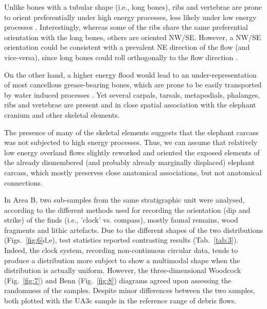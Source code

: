 \documentclass[preprint,authoryear,times]{elsarticle} %
\begin{document}

Unlike bones with a tubular shape (i.e., long bones), ribs and vertebrae are prone to orient preferentially under high energy processes, less likely under low energy processes \citep{Dominguez-Rodrigo2013,Dominguez-Rodrigo2014}. Interestingly, whereas some of the ribs share the same preferential orientation with the long bones, others are oriented NW/SE. However, a NW/SE orientation could be consistent with a prevalent NE direction of the flow (and vice-versa), since long bones could roll orthogonally to the flow direction \citep{Voorhies1966}.

On the other hand, a higher energy flood would lead to an under-representation of most cancellous grease-bearing bones, which are prone to be easily transported by water induced processes \citep{Voorhies1966}. Yet several carpals, tarsals, metapodials, phalanges, ribs and vertebrae are present and in close spatial association with the elephant cranium and other skeletal elements.

The presence of many of the skeletal elements suggests that the elephant carcass was not subjected to high energy processes. Thus, we can assume that relatively low energy overland flows slightly reworked and oriented the exposed elements of the already dismembered (and probably already marginally displaced) elephant carcass, which mostly preserves close anatomical associations, but not anatomical connections.



In Area B, two sub-samples from the same stratigraphic unit were analysed, according to the different methods used for recording the orientation (dip and strike) of the finds (i.e., 'clock' vs. compass), mostly faunal remains, wood fragments and lithic artefacts. Due to the different shapes of the two distributions (Figs.~\ref{fig:6}d,e), test statistics reported contrasting results (Tab.~\ref{tab:3}). Indeed, the clock system, recording non-continuous circular data, tends to produce a distribution more subject to show a multimodal shape when the distribution is actually uniform. However, the three-dimensional Woodcock (Fig.~\ref{fig:7}) and Benn (Fig.~\ref{fig:8}) diagrams agreed upon assessing the randomness of the samples. Despite minor differences between the two samples, both plotted with the UA3c sample in the reference range of debris flows.
\end{document}
